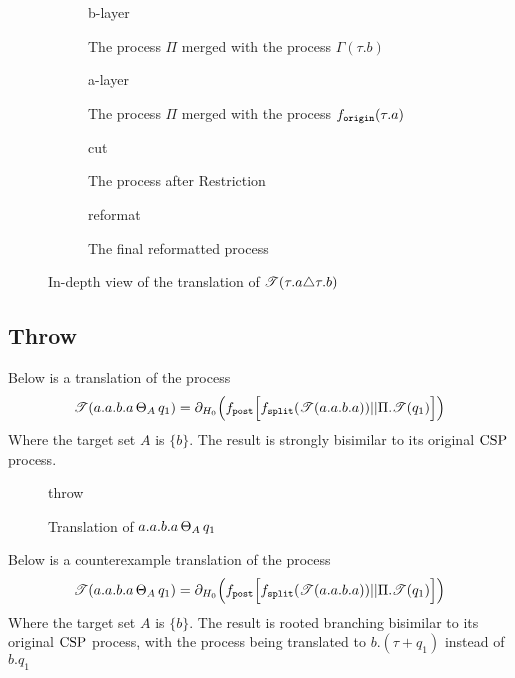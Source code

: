 \documentclass[../hons_project.tex]{subfiles}
\begin{document}
\begin{figure}[!ht]
	\centering
	\begin{subfigure}[b]{0.55\textwidth}
		{b-layer}
		\caption{The process $\Pi$ merged with the process $\Gamma(\tau.b)$}
	\end{subfigure}
	\hfill
	\begin{subfigure}[b]{0.43\textwidth}
		{a-layer}
		\caption{The process $\Pi$ merged with the process $f_{\mathtt{origin}}(\tau.a)$}
	\end{subfigure}\hfill

	\begin{subfigure}[b]{0.65\textwidth}
		{cut}
		\caption{The process after Restriction}
	\end{subfigure}\hfill
	\begin{subfigure}[b]{0.3\textwidth}
		{reformat}
		\caption{The final reformatted process}
	\end{subfigure}
	\caption{In-depth view of the translation of $\mathscr{T}(\tau.a \triangle \tau.b)$}
\end{figure}





\newpage
\subsection{Throw}\label{ssec:diagrams-throw}

Below is a translation of the process
		\[\mathscr{T}(a.a.b.a \,\Theta_{A}\, q_{1})     = \partial_{H_{0}}\Bigl(f_{\mathtt{post}} \Bigl[ f_{\mathtt{split}}(\mathscr{T}(a.a.b.a)) | | \Pi.\mathscr{T}(q_{1}) \Bigr]\Bigr)\]
Where the target set $A$ is $\{b\}$. The result is strongly bisimilar to its original $\mathrm{CSP}$ process.
\begin{figure}[H]
	\centering
	{throw}
	\caption{Translation of $a.a.b.a \,\Theta_{A}\, q_{1}$}
\end{figure}

Below is a counterexample translation of the process
		\[\mathscr{T}(a.a.b.a \,\Theta_{A}\, q_{1})     = \partial_{H_{0}}\Bigl(f_{\mathtt{post}} \Bigl[ f_{\mathtt{split}}(\mathscr{T}(a.a.b.a)) | | \Pi.\mathscr{T}(q_{1}) \Bigr]\Bigr)\]
Where the target set $A$ is $\{b\}$. The result is rooted branching bisimilar to its original $\mathrm{CSP}$ process, with the process being translated to $b.(\tau + q_{1})$ instead of $b.q_{1}$
\end{document}
